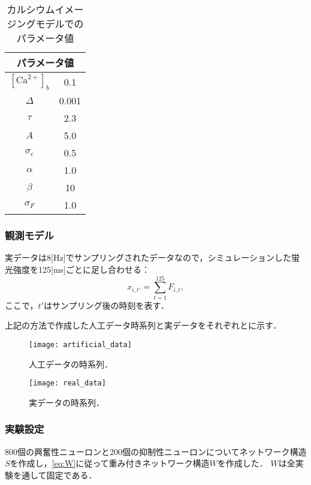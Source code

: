 \begin{table}[htb]
  \center
  \begin{tabular}{c|c}
		\multicolumn{2}{c}{パラメータ値} \\ \hline
		$[\text{Ca}^{2+}]_b$ & 0.1\\
		$\Delta$ & 0.001\\
		$\tau$ & 2.3\\
		$A$ & 5.0\\
		$\sigma_c$ & 0.5 \\
		$\alpha$ & 1.0\\
		$\beta$ & 10\\
		$\sigma_F$ & 1.0\\ \hline
  \end{tabular}
  \caption{カルシウムイメージングモデルでのパラメータ値}
  \label{tab:parameter2}
\end{table}

\subsubsection{観測モデル}
実データは8[Hz]でサンプリングされたデータなので，シミュレーションした蛍光強度を125[ms]ごとに足し合わせる：
\begin{equation}
  x_{i,t'} = \sum_{t=1}^{125} F_{i,t},
  \label{eq:observation}
\end{equation}
ここで，$t'$はサンプリング後の時刻を表す．

上記の方法で作成した人工データ時系列と実データをそれぞれとに示す．
\begin{figure}[htbp]
    \begin{minipage}{0.5\hsize}
			\begin{center}
					\texttt{[image: artificial\_data]}
					\caption{人工データの時系列．}
					\label{fig:art}
			\end{center}
		\end{minipage}
    \begin{minipage}{0.5\hsize}
			\begin{center}
					\texttt{[image: real\_data]}
					\caption{実データの時系列．}
					\label{fig:dat}
			\end{center}
		\end{minipage}
\end{figure}

\subsubsection{実験設定}
800個の興奮性ニューロンと200個の抑制性ニューロンについてネットワーク構造$S$を作成し，\eqref{eq:W}に従って重み付きネットワーク構造$W$を作成した．
$W$は全実験を通して固定である．

